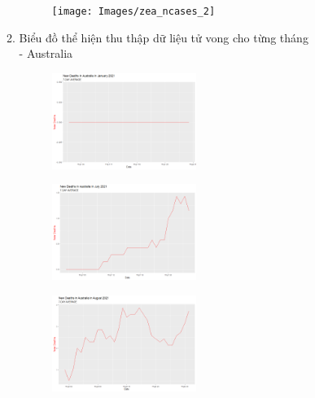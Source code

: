 \documentclass[a4paper]{article}
\theoremstyle{definition}
\begin{document}
\begin{enumerate}[i)]
\begin{enumerate}[1)]
		\begin{figure} [!htp]
  		\centering
  		\texttt{[image: Images/zea\_ncases\_2]}
		\end{figure}
    \item Biểu đồ thể hiện thu thập dữ liệu tử vong cho từng tháng\\
    - Australia\\
		\begin{figure} [!htp]
  		\centering
  		\includegraphics [width=0.47\textwidth] {Images/aus_ndeaths_7}
		\end{figure}
		
		\begin{figure} [!htp]
  		\centering
  		\includegraphics [width=0.47\textwidth] {Images/aus_ndeaths_6}
		\end{figure}
		
		\begin{figure} [!htp]
  		\centering
  		\includegraphics [width=0.47\textwidth] {Images/aus_ndeaths_4}
		\end{figure}
		

\end{enumerate}
\end{enumerate}
\end{document}
